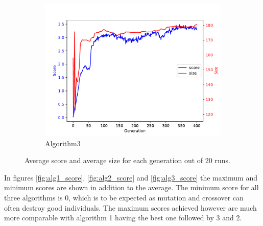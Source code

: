 \documentclass[12pt,a4paper]{article}
\begin{document}
\begin{figure}[h!]
\begin{subfigure}{.33\textwidth}
			\includegraphics[width=\linewidth]{../code/plots/alg3_score_vs_size}
			\caption{Algorithm3}
			\label{fig:alg3_score_vs_size}
			\end{subfigure}
			
			\caption{Average score and average size for each generation out of 20 runs.}
			\label{fig:score_vs_size}
		\end{figure}
		
		In figures \autoref{fig:alg1_score}, \autoref{fig:alg2_score} and \autoref{fig:alg3_score} the maximum and minimum scores are shown in addition to the average. The minimum score for all three algorithms is 0, which is to be expected as mutation and crossover can often destroy good individuals. The maximum scores achieved however are much more comparable with algorithm 1 having the best one followed by 3 and 2.
		
\end{document}
